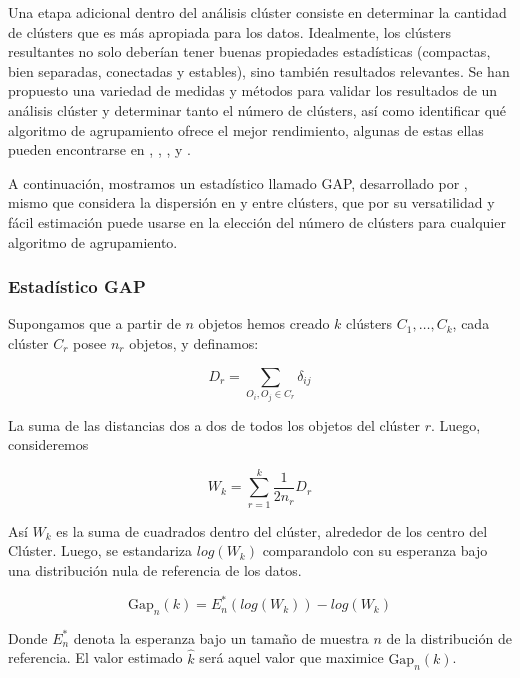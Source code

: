 \documentclass[12pt,oneside]{book}\usepackage[]{graphicx}\usepackage[]{color}
\theoremstyle{definition} %
\begin{document}
Una etapa adicional dentro del análisis clúster consiste en determinar la cantidad de clústers que es más apropiada para los datos. Idealmente, los clústers resultantes no solo deberían tener buenas propiedades estadísticas (compactas, bien separadas, conectadas y estables), sino también resultados relevantes. Se han propuesto una variedad de medidas y métodos para validar los resultados de un análisis clúster y determinar tanto el número de clústers, así como identificar qué algoritmo de agrupamiento ofrece el mejor rendimiento, algunas de estas ellas pueden encontrarse en \citeauthor{fraley1998many} \citeyear{fraley1998many}, \citeauthor{duda2001pattern} \citeyear{duda2001pattern}, \citeauthor{salvador2004determining} , y \citeauthor{kerr2001bootstrapping} \citeyear{kerr2001bootstrapping}. 


A continuación, mostramos un estadístico llamado GAP, desarrollado por \citeauthor{tibshirani2001estimating} \citeyear{tibshirani2001estimating}, mismo que considera la dispersión en y entre clústers, que por su versatilidad y fácil estimación puede usarse en la elección del número de clústers para cualquier algoritmo de agrupamiento.

\subsubsection{Estadístico GAP}

Supongamos que a partir de $n$ objetos hemos creado $k$ clústers $C_1,\dots,C_k$, cada clúster $C_r$ posee $n_r$ objetos, y definamos:

\[
D_r = \sum_{O_i,O_j\in C_r} \delta_{ij} 
\]

La suma de las distancias dos a dos de todos los objetos del clúster $r$. Luego, consideremos 

\[
W_k = \sum_{r=1}^k \frac{1}{2n_r}D_r
\]

Así $W_k$ es la suma de cuadrados dentro del clúster, alrededor de los centro del Clúster. Luego, se estandariza  $log(W_k)$ comparandolo con su esperanza bajo una distribución nula de referencia de los datos.

\[
\text{Gap}_n(k) = E_n^*(log(W_k))-log(W_k)
\]

Donde $E_n^*$ denota la esperanza bajo un tamaño de muestra $n$ de la distribución de referencia. El valor estimado $\hat k$ será aquel valor que maximice $\text{Gap}_n(k)$.


\end{document}
